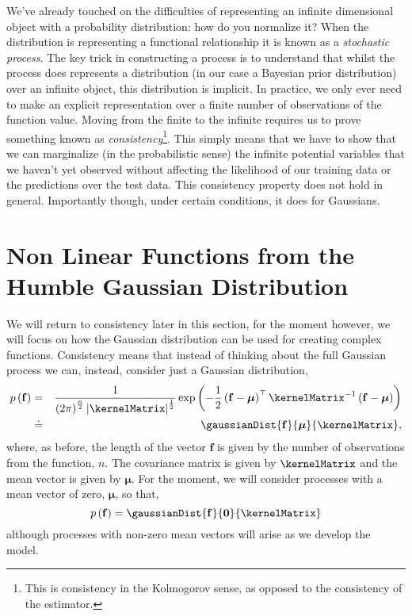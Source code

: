 We've already touched on the difficulties of representing an infinite
dimensional object with a probability distribution: how do you
normalize it? When the distribution is representing a functional
relationship it is known as a \emph{stochastic process}. The key trick
in constructing a process is to understand that whilst the process
does represents a distribution (in our case a Bayesian prior
distribution) over an infinite object, this distribution is
implicit. In practice, we only ever need to make an explicit
representation over a finite number of observations of the function
value. Moving from the finite to the infinite requires us to prove
something known as \emph{consistency}\footnote{This is consistency in
  the Kolmogorov sense, as opposed to the consistency of the
  estimator.}. This simply means that we have to show that we can
marginalize (in the probabilistic sense) the infinite potential
variables that we haven't yet observed without affecting the
likelihood of our training data or the predictions over the test
data. This consistency property does not hold in general. Importantly
though, under certain conditions, it does for Gaussians.

\section{Non Linear Functions from the Humble Gaussian Distribution}\label{sec:humbleGaussian}

We will return to consistency later in this section, for the moment
however, we will focus on how the Gaussian distribution can be used
for creating complex functions. Consistency means that instead of
thinking about the full Gaussian process we can, instead, consider
just a Gaussian distribution,
\begin{eqnarray*}
  p\left(\mathbf{f}\right) & = & \frac{1}{\left(2\pi\right)^{\frac{n}{2}}\left|\kernelMatrix\right|^{\frac{1}{2}}}\exp\left(-\frac{1}{2}\left(\mathbf{f}-\boldsymbol{\mu}\right)^{\top}\kernelMatrix^{-1}\left(\mathbf{f}-\boldsymbol{\mu}\right)\right)\\
  & \doteq & \gaussianDist{\mathbf{f}}{\boldsymbol{\mu}}{\kernelMatrix},
\end{eqnarray*} 
where, as before, the length of the vector $\mathbf{f}$ is given by
the number of observations from the function, $n$. The covariance
matrix is given by $\kernelMatrix$ and the mean vector is given by
$\boldsymbol{\mu}$.  For the moment, we will consider processes with a
mean vector of zero, $\boldsymbol{\mu}$, so that,
\[
p\left(\mathbf{f}\right)=\gaussianDist{\mathbf{f}}{\mathbf{0}}{\kernelMatrix}
\]
although processes with non-zero mean vectors will arise as we develop
the model.

